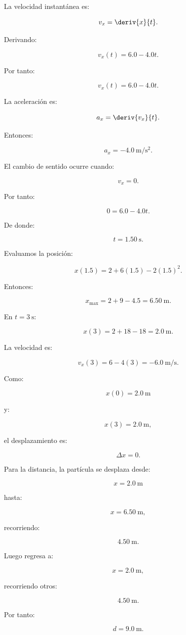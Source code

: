 \begin{explicacion}
La velocidad instantánea es:

\[ v_x=\deriv{x}{t}. \]

Derivando:

\[
v_x(t)
=
6.0-4.0t.
\]

Por tanto:

\[ \boxed{v_x(t)=6.0-4.0t}. \]

La aceleración es:

\[ a_x=\deriv{v_x}{t}. \]

Entonces:

\[ \boxed{a_x=-\SI{4.0}{\meter\per\second\squared}}. \]

El cambio de sentido ocurre cuando:

\[ v_x=0. \]

Por tanto:

\[
0=6.0-4.0t.
\]

De donde:

\[ \boxed{t=\SI{1.50}{\second}}. \]

Evaluamos la posición:

\[
x(1.5)
=
2+6(1.5)-2(1.5)^2.
\]

Entonces:

\[
x_{\max}
=
2+9-4.5
=
\boxed{\SI{6.50}{\meter}}.
\]

En \(t=\SI{3}{\second}\):

\[
x(3)
=
2+18-18
=
\boxed{\SI{2.0}{\meter}}.
\]

La velocidad es:

\[
v_x(3)
=
6-4(3)
=
\boxed{-\SI{6.0}{\meter\per\second}}.
\]

Como:

\[
x(0)=\SI{2.0}{\meter}
\]

y:

\[
x(3)=\SI{2.0}{\meter},
\]

el desplazamiento es:

\[ \boxed{\Delta x=0}. \]

Para la distancia, la partícula se desplaza desde:

\[
x=\SI{2.0}{\meter}
\]

hasta:

\[
x=\SI{6.50}{\meter},
\]

recorriendo:

\[ \SI{4.50}{\meter}. \]

Luego regresa a:

\[ x=\SI{2.0}{\meter}, \]

recorriendo otros:

\[ \SI{4.50}{\meter}. \]

Por tanto:

\[ \boxed{d=\SI{9.0}{\meter}}. \]
\end{explicacion}


